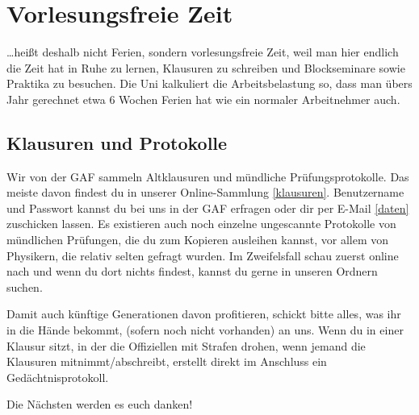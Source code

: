 ﻿\chapter{Vorlesungsfreie Zeit}

\ldots heißt deshalb nicht Ferien, sondern vorlesungsfreie Zeit, weil man hier
endlich die Zeit hat in Ruhe zu lernen, Klausuren zu schreiben und
Blockseminare sowie Praktika zu besuchen. Die Uni kalkuliert die
Arbeitsbelastung so, dass man übers Jahr gerechnet etwa 6 Wochen Ferien hat wie
ein normaler Arbeitnehmer auch.

\section{Klausuren und Protokolle}
Wir von der GAF sammeln Altklausuren und mündliche Prüfungsprotokolle. Das
meiste davon findest du in unserer Online-Sammlung \ref{klausuren}.
Benutzername und Passwort kannst du bei uns in der GAF erfragen oder dir per
E-Mail \ref{daten} zuschicken lassen.  Es existieren auch noch einzelne
ungescannte Protokolle von mündlichen Prüfungen, die du zum Kopieren ausleihen
kannst, vor allem von Physikern, die relativ selten gefragt wurden. Im
Zweifelsfall schau zuerst online nach und wenn du dort nichts findest, kannst
du gerne in unseren Ordnern suchen.

Damit auch künftige Generationen davon profitieren, schickt bitte alles,
was ihr in die Hände bekommt, (sofern noch nicht vorhanden) an uns.
Wenn du in einer Klausur sitzt, in der die Offiziellen mit Strafen
drohen, wenn jemand die Klausuren mitnimmt/abschreibt, erstellt
direkt im Anschluss ein Gedächtnisprotokoll.

Die Nächsten werden es euch danken!

\begin{urlList}
\end{urlList}

